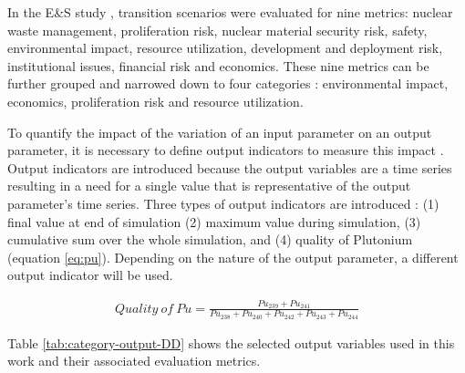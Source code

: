 In the E\&S study 
\cite{wigeland_nuclear_2014}, transition 
scenarios were evaluated for nine metrics: nuclear waste 
management, proliferation risk, nuclear material security risk, 
safety, environmental impact, resource utilization, development 
and deployment risk, institutional issues, financial risk and 
economics. 
These nine metrics can be further grouped and narrowed down to 
four categories \cite{passerini_systematic_2014}: environmental 
impact, economics, proliferation risk and resource utilization. 

To quantify the impact of the variation of an input parameter 
on an output parameter, it is necessary to define output indicators 
to measure this impact \cite{noauthor_effects_2017}. 
Output indicators are introduced because the output variables
are a time series resulting in a need for a single value that 
is representative of the output parameter's time series.  
Three types of output indicators are introduced 
\cite{noauthor_effects_2017}: 
(1) final value at end of simulation
(2) maximum value during simulation,  
(3) cumulative sum over the whole simulation, and 
(4) quality of Plutonium (equation \ref{eq:pu}). 
Depending on the nature of the output parameter, a different 
output indicator will be used. 

\begin{align}
    \label{eq:pu}
Quality\ of\ Pu = \frac{Pu_{239}+Pu_{241}}{Pu_{238}+Pu_{240}+Pu_{242}+Pu_{243}+Pu_{244}}
\end{align}

Table \ref{tab:category-output-DD} shows the selected 
output variables used in this work and their associated 
evaluation metrics. 

